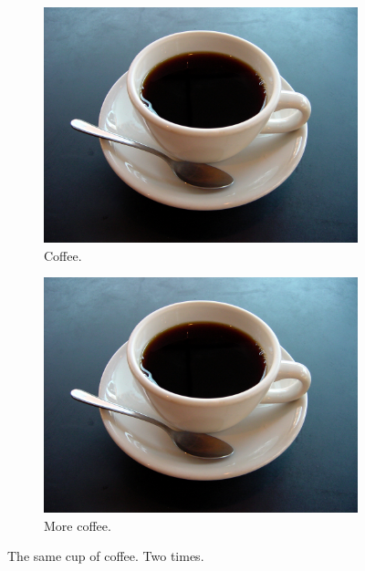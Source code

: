 \documentclass{article}
\begin{document}
\begin{figure}[h!]
    \centering
    \begin{subfigure}[b]{0.4\linewidth}
        \includegraphics[width=\linewidth]{coffee.jpg}
        \caption{Coffee.}
    \end{subfigure}
    \begin{subfigure}[b]{0.4\linewidth}
        \includegraphics[width=\linewidth]{coffee.jpg}
        \caption{More coffee.}
    \end{subfigure}
    \caption{The same cup of coffee. Two times.}
    \label{fig:coffee}
  \end{figure}
\end{document}

